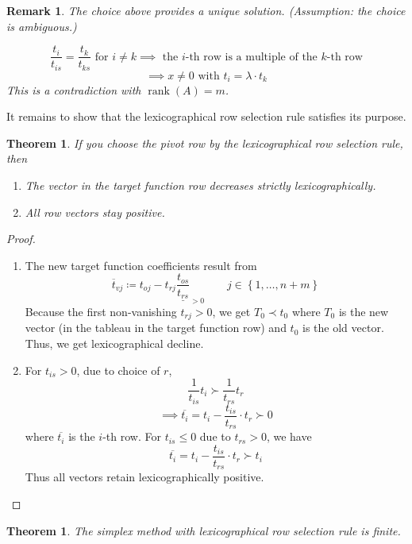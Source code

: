 \documentclass[a4paper]{article}
\newcounter{lecref}[subsection]
\numberwithin{lecref}{subsection}
\newtheorem{theorem}[lecref]{Theorem}
\newtheorem*{Remark}{Remark}
\newcommand{\Set}[1]{\left\{#1\right\}}
\begin{document}
\begin{Remark}
	The choice above provides a unique solution.
	(Assumption: the choice is ambiguous.)

	\[ \frac{t_{i}}{t_{is}} = \frac{t_k}{t_{ks}} \text{ for } i \neq k \implies \text{ the $i$-th row is a multiple of the $k$-th row} \]
	\[ \implies x \neq 0 \text{ with } t_i = \lambda \cdot t_k \]
	This is a contradiction with $\operatorname{rank}(A) = m$.
\end{Remark}

It remains to show that the lexicographical row selection rule satisfies its purpose.

\begin{theorem}
	\label{theorem:2.2}
	If you choose the pivot row by the lexicographical row selection rule, then
	\begin{enumerate}
		\item The vector in the target function row decreases strictly lexicographically.
		\item All row vectors stay positive.
	\end{enumerate}
\end{theorem}

\begin{proof}
	\begin{enumerate}
		\item The new target function coefficients result from
			\[ \overline{t}_{vj} \coloneqq t_{oj} - t_{rj} \underline{\frac{t_{os}}{t_{rs}}}_{> 0} \qquad j \in \Set{1, \dots, n+m} \]
			Because the first non-vanishing $t_{rj} > 0$, we get $T_0 \prec t_0$ where $T_0$ is the new vector (in the tableau in the target function row) and $t_0$ is the old vector.
			Thus, we get lexicographical decline.
		\item For $t_{is} > 0$, due to choice of $r$,
			\[ \frac{1}{t_{is}} t_i \succ \frac{1}{t_{rs}} t_r \]
			\[ \implies \overline{t_i} = t_i - \frac{t_{is}}{t_{rs}} \cdot t_r \succ 0 \]
			where $\overline{t_i}$ is the $i$-th row. For $t_{is} \leq 0$ due to $t_{rs} > 0$, we have
			\[ \overline{t_i} = t_i - \frac{t_{is}}{t_{rs}} \cdot t_r \succ t_i \]
			Thus all vectors retain lexicographically positive.
	\end{enumerate}
\end{proof}

\begin{theorem}
	\label{theorem:2.3}
	The simplex method with lexicographical row selection rule is finite.
\end{theorem}
\end{document}
